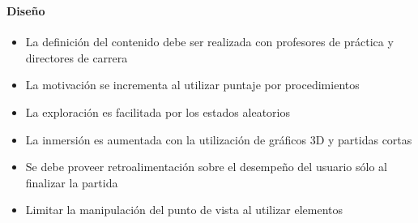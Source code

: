 \begin{frame}
\frametitle{\pagetitle}
\framesubtitle{Diseño}
\begin{itemize}[<+->]


\item La definición del contenido debe ser realizada con profesores de 
práctica y directores de carrera

\item La motivación se incrementa al utilizar puntaje por procedimientos

\item La exploración es facilitada por los estados aleatorios

\item La inmersión es aumentada con la utilización de gráficos 3D
y partidas cortas

\item Se debe proveer retroalimentación sobre el desempeño del usuario sólo
al finalizar la partida



\item Limitar la manipulación del punto de vista al utilizar elementos

\end{itemize}
\end{frame}

